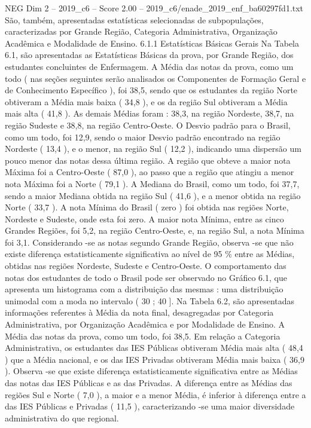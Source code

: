 \begin{textsample}{NEG Dim 2 – 2019\_c6 – Score 2.00 – 2019\_c6/enade\_2019\_enf\_ba60297fd1.txt}
São, também, apresentadas estatísticas selecionadas de subpopulações, caracterizadas por Grande Região, Categoria Administrativa, Organização Acadêmica e Modalidade de Ensino. 6.1.1 Estatísticas Básicas Gerais Na Tabela 6.1, são apresentadas as Estatísticas Básicas da prova, por Grande Região, dos estudantes concluintes de Enfermagem.
A Média das notas da prova, como um todo ( nas seções seguintes serão analisados os Componentes de Formação Geral e de Conhecimento Específico ), foi 38,5, sendo que os estudantes da região Norte obtiveram a Média mais baixa ( 34,8 ), e os da região Sul obtiveram a Média mais alta ( 41,8 ).
As demais Médias foram : 38,3, na região Nordeste, 38,7, na região Sudeste e 38,8, na região Centro-Oeste.
O Desvio padrão para o Brasil, como um todo, foi 12,9, sendo o maior Desvio padrão encontrado na região Nordeste ( 13,4 ), e o menor, na região Sul ( 12,2 ), indicando uma dispersão um pouco menor das notas dessa última região.
A região que obteve a maior nota Máxima foi a Centro-Oeste ( 87,0 ), ao passo que a região que atingiu a menor nota Máxima foi a Norte ( 79,1 ).
A Mediana do Brasil, como um todo, foi 37,7, sendo a maior Mediana obtida na região Sul ( 41,6 ), e a menor obtida na região Norte ( 33,7 ).
A nota Mínima do Brasil ( zero ) foi obtida nas regiões Norte, Nordeste e Sudeste, onde esta foi zero.
A maior nota Mínima, entre as cinco Grandes Regiões, foi 5,2, na região Centro-Oeste, e, na região Sul, a nota Mínima foi 3,1.
Considerando -se as notas segundo Grande Região, observa -se que não existe diferença estatisticamente significativa ao nível de 95 \% entre as Médias, obtidas nas regiões Nordeste, Sudeste e Centro-Oeste.
O comportamento das notas dos estudantes de todo o Brasil pode ser observado no Gráfico 6.1, que apresenta um histograma com a distribuição das mesmas : uma distribuição unimodal com a moda no intervalo ( 30 ; 40 ].
Na Tabela 6.2, são apresentadas informações referentes à Média da nota final, desagregadas por Categoria Administrativa, por Organização Acadêmica e por Modalidade de Ensino.
A Média das notas da prova, como um todo, foi 38,5.
Em relação a Categoria Administrativa, os estudantes das IES Públicas obtiveram Média mais alta ( 48,4 ) que a Média nacional, e os das IES Privadas obtiveram Média mais baixa ( 36,9 ).
Observa -se que existe diferença estatisticamente significativa entre as Médias das notas das IES Públicas e as das Privadas.
A diferença entre as Médias das regiões Sul e Norte ( 7,0 ), a maior e a menor Média, é inferior à diferença entre a das IES Públicas e Privadas ( 11,5 ), caracterizando -se uma maior diversidade administrativa do que regional.

\end{textsample}

